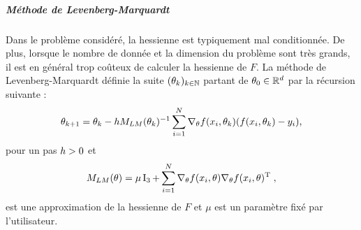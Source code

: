 \documentclass[a4paper,french,12pt]{article}
\begin{document}
\subparagraph{Méthode de Levenberg-Marquardt}
Dans le problème considéré, la hessienne est typiquement mal conditionnée. De plus, lorsque le nombre de donnée et la dimension du problème sont très grands, il est en général trop coûteux de calculer la hessienne de $F$. La méthode de Levenberg-Marquardt définie la suite $(\theta_k)_{k \in \mathbb{N}}$ partant de $\theta_0 \in \mathbb{R}^d$ par la récursion suivante :
\[
  \theta_{k+1} = \theta_{k} - h M_{LM}(\theta_{k})^{-1} \sum_{i=1}^N \nabla_{\theta} f(x_i,\theta_{k}) (f(x_i,\theta_{k}) - y_i),
\]
pour un pas $h >0$ et
\begin{equation*}
  M_{LM}(\theta) = \mu \operatorname{I}_3 + \sum_{i = 1}^{N} \nabla_{\theta}f(x_i,\theta) \nabla_{\theta}f(x_i,\theta)^{\mathrm{T}}  \;,
\end{equation*}
est une approximation de la hessienne de $F$ et $\mu$ est un paramètre fixé par l'utilisateur. %
\end{document}
